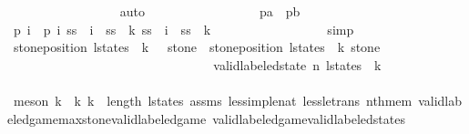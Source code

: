 \begin{isabellebody}
\ \ \ \ \ \ \ \ \ \ \ \ \ \ \ \ \isamarkupfalse%
\ auto\isanewline
\ \ \ \ \ \ \ \ \ \ \ \ \ \ \isamarkupfalse%
\ \isamarkupfalse%
\ {\isachardoublequoteopen}p{}a\ {\isasymnoteq}\ p{}b{\isachardoublequoteclose}\isanewline
\ \ \ \ \ \ \ \ \ \ \ \ \ \ \ \ \isamarkupfalse%
\ {\isacharbackquoteopen}{\isacharquery}p{}\ i\ {\isasymnoteq}\ {\isacharquery}p{}\ {\isacharparenleft}i{\isacharminus}{}{\isacharparenright}{\isacharbackquoteclose}\ {\isacharbackquoteopen}ss\ {\isacharbang}\ {\isacharparenleft}i{\isacharminus}{}{\isacharparenright}\ {\isacharequal}\ {\isacharquery}ss\ {\isacharbang}\ k{}{\isacharbackquoteclose}\ {\isacharbackquoteopen}ss\ {\isacharbang}\ i\ {\isacharequal}\ {\isacharquery}ss\ {\isacharbang}\ k{}{\isacharbackquoteclose}\isanewline
\ \ \ \ \ \ \ \ \ \ \ \ \ \ \ \ \isamarkupfalse%
\ simp\isanewline
\isanewline
\ \ \ \ \ \ \ \ \ \ \ \ \ \ \isamarkupfalse%
\ {\isachardoublequoteopen}stone{\isacharunderscore}position\ {\isacharparenleft}l{\isacharunderscore}states\ {\isacharbang}\ {\isacharparenleft}k{}\ {\isacharplus}\ {}{\isacharparenright}{\isacharparenright}\ stone\ {\isasymnoteq}\ stone{\isacharunderscore}position\ {\isacharparenleft}l{\isacharunderscore}states\ {\isacharbang}\ k{}{\isacharparenright}\ stone{\isachardoublequoteclose}\isanewline
\ \ \ \ \ \ \ \ \ \ \ \ \ \ \isamarkupfalse%
{\isacharminus}\isanewline
\ \ \ \ \ \ \ \ \ \ \ \ \ \ \ \ \isamarkupfalse%
\ {\isachardoublequoteopen}valid{\isacharunderscore}labeled{\isacharunderscore}state\ n\ {\isacharparenleft}l{\isacharunderscore}states\ {\isacharbang}\ k{}{\isacharparenright}{\isachardoublequoteclose}\isanewline
\ \ \ \ \ \ \ \ \ \ \ \ \ \ \ \ \ \ \isamarkupfalse%
\ {\isacharparenleft}meson\ {\isacartoucheopen}k{}\ {\isacharless}\ k{}{\isacartoucheclose}\ {\isacartoucheopen}k{}\ {\isacharless}\ length\ l{\isacharunderscore}states{\isacartoucheclose}\ assms\ less{\isacharunderscore}imp{\isacharunderscore}le{\isacharunderscore}nat\ less{\isacharunderscore}le{\isacharunderscore}trans\ nth{\isacharunderscore}mem\ valid{\isacharunderscore}labeled{\isacharunderscore}game{\isacharunderscore}max{\isacharunderscore}stone{\isacharunderscore}valid{\isacharunderscore}labeled{\isacharunderscore}game\ valid{\isacharunderscore}labeled{\isacharunderscore}game{\isacharunderscore}valid{\isacharunderscore}labeled{\isacharunderscore}states{\isacharparenright}\isanewline

\end{isabellebody}

